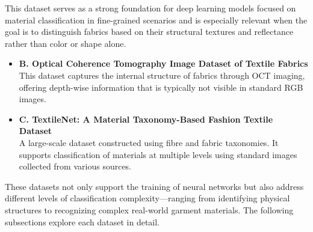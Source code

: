 This dataset serves as a strong foundation for deep learning models focused on material classification in fine-grained scenarios and is especially relevant when the goal is to distinguish fabrics based on their structural textures and reflectance rather than color or shape alone.

\begin{itemize}
    \item \textbf{B. Optical Coherence Tomography Image Dataset of Textile Fabrics} \\
    This dataset captures the internal structure of fabrics through OCT imaging, offering depth-wise information that is typically not visible in standard RGB images.

    \item \textbf{C. TextileNet: A Material Taxonomy-Based Fashion Textile Dataset} \\
    A large-scale dataset constructed using fibre and fabric taxonomies. It supports classification of materials at multiple levels using standard images collected from various sources.
\end{itemize}

These datasets not only support the training of neural networks but also address different levels of classification complexity—ranging from identifying physical structures to recognizing complex real-world garment materials. The following subsections explore each dataset in detail.
